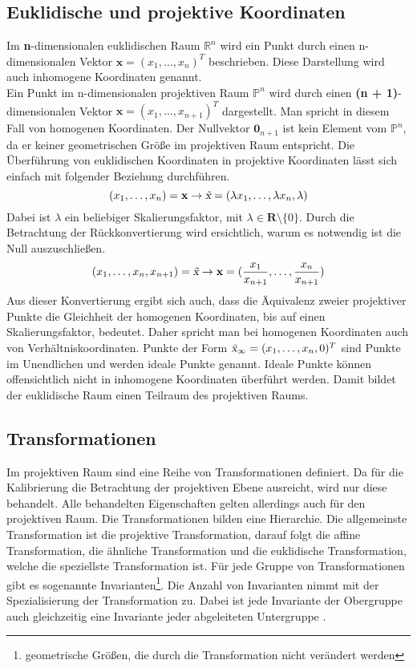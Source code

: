 \subsection {Euklidische und projektive Koordinaten}
Im \textbf{n}-dimensionalen euklidischen Raum ${\mathbb{R}}^{n}$ wird ein Punkt durch einen n-dimensionalen Vektor $\textbf{x} = (x_1,\dots ,x_n)^T$ beschrieben. Diese Darstellung wird auch inhomogene Koordinaten genannt.\\
Ein Punkt im n-dimensionalen projektiven Raum ${\mathbb{P}}^{n}$ wird durch einen \textbf{(n + 1)}-dimensionalen Vektor $\textbf{\~x} = (x_1,\dots ,x_{n+1})^T$ dargestellt. Man spricht in diesem Fall von homogenen Koordinaten. Der Nullvektor $\textbf{0}_{n+1}$ ist kein Element vom ${\mathbb{P}}^{n}$, da er keiner geometrischen Gr\"o{\ss}e im projektiven Raum entspricht. Die \"Uberf\"uhrung von euklidischen Koordinaten in projektive Koordinaten l\"asst sich einfach mit folgender Beziehung durchf\"uhren.
\begin{equation}
	(x_1, \dots, x_n) = \textbf{x}\rightarrow \textsl{\~x}= (\lambda x_1, \dots,\lambda x_n, \lambda) 
\end{equation}
Dabei ist $\lambda$ ein beliebiger Skalierungsfaktor, mit $\lambda \in \textbf{R} \setminus \{0\}$. Durch die Betrachtung der R\"uckkonvertierung wird ersichtlich, warum es notwendig ist die Null auszuschlie{\ss}en.
\begin{equation}
	(x_1,\dots,x_n,x_{n+1}) = \textsl{\~x} \rightarrow \textbf{x} = (\frac{x_1}{x_{n+1}},\dots,\frac{x_n}{x_{n+1}})
\end{equation}
Aus dieser Konvertierung ergibt sich auch, dass die \"Aquivalenz zweier projektiver Punkte die Gleichheit der homogenen Koordinaten, bis auf einen Skalierungsfaktor, bedeutet. Daher spricht man bei homogenen Koordinaten auch von Verh\"altniskoordinaten. Punkte der Form $\textsl{\~x}_{\infty}= (x_1,\dots,x_n,0)^T$ sind Punkte im Unendlichen und werden ideale Punkte genannt. Ideale Punkte k\"onnen offensichtlich nicht in inhomogene Koordinaten \"uberf\"uhrt werden. Damit bildet der euklidische Raum einen Teilraum des projektiven Raums\cite{Rahmann2011}.

\subsection{Transformationen}
Im projektiven Raum sind eine Reihe von Transformationen definiert. Da f\"ur die Kalibrierung die Betrachtung der projektiven Ebene ausreicht, wird nur diese behandelt. Alle behandelten Eigenschaften gelten allerdings auch f\"ur den projektiven Raum. Die Transformationen bilden eine Hierarchie. Die allgemeinste Transformation ist die projektive Transformation, darauf folgt die affine Transformation, die \"ahnliche Transformation und die euklidische Transformation, welche die speziellste Transformation ist. F\"ur jede Gruppe von Transformationen gibt es sogenannte Invarianten\footnote{geometrische Gr\"oßen, die durch die Transformation nicht ver\"andert werden}. Die Anzahl von Invarianten nimmt mit der Spezialisierung der Transformation zu. Dabei ist jede Invariante der Obergruppe auch gleichzeitig eine Invariante jeder abgeleiteten Untergruppe \cite{Rahmann2011}.

